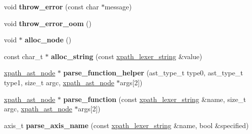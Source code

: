 \begin{DoxyCompactItemize}
\item 
\hypertarget{structxpath__parser_a043353db574741cd4f460a042a0b22c6}{}void {\bfseries throw\+\_\+error} (const char $\ast$message)\label{structxpath__parser_a043353db574741cd4f460a042a0b22c6}

\item 
\hypertarget{structxpath__parser_aeb5c7d7a6f8c5705a769297f42960c3e}{}void {\bfseries throw\+\_\+error\+\_\+oom} ()\label{structxpath__parser_aeb5c7d7a6f8c5705a769297f42960c3e}

\item 
\hypertarget{structxpath__parser_ae33adcc8eb125124967d95297daff351}{}void $\ast$ {\bfseries alloc\+\_\+node} ()\label{structxpath__parser_ae33adcc8eb125124967d95297daff351}

\item 
\hypertarget{structxpath__parser_a109e4c472bb76911a2b49ee741d400af}{}const char\+\_\+t $\ast$ {\bfseries alloc\+\_\+string} (const \hyperlink{structxpath__lexer__string}{xpath\+\_\+lexer\+\_\+string} \&value)\label{structxpath__parser_a109e4c472bb76911a2b49ee741d400af}

\item 
\hypertarget{structxpath__parser_a21a1a2579c610e0ebd76247b9d325bb1}{}\hyperlink{classxpath__ast__node}{xpath\+\_\+ast\+\_\+node} $\ast$ {\bfseries parse\+\_\+function\+\_\+helper} (ast\+\_\+type\+\_\+t type0, ast\+\_\+type\+\_\+t type1, size\+\_\+t argc, \hyperlink{classxpath__ast__node}{xpath\+\_\+ast\+\_\+node} $\ast$args\mbox{[}2\mbox{]})\label{structxpath__parser_a21a1a2579c610e0ebd76247b9d325bb1}

\item 
\hypertarget{structxpath__parser_a7acb32147ef3aac058f94257b57ff14f}{}\hyperlink{classxpath__ast__node}{xpath\+\_\+ast\+\_\+node} $\ast$ {\bfseries parse\+\_\+function} (const \hyperlink{structxpath__lexer__string}{xpath\+\_\+lexer\+\_\+string} \&name, size\+\_\+t argc, \hyperlink{classxpath__ast__node}{xpath\+\_\+ast\+\_\+node} $\ast$args\mbox{[}2\mbox{]})\label{structxpath__parser_a7acb32147ef3aac058f94257b57ff14f}

\item 
\hypertarget{structxpath__parser_ad67ec26e0e286ca1bb5144a79e3a3583}{}axis\+\_\+t {\bfseries parse\+\_\+axis\+\_\+name} (const \hyperlink{structxpath__lexer__string}{xpath\+\_\+lexer\+\_\+string} \&name, bool \&specified)\label{structxpath__parser_ad67ec26e0e286ca1bb5144a79e3a3583}


\end{DoxyCompactItemize}
